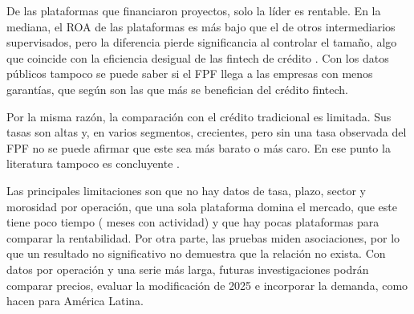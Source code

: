 De las plataformas que financiaron proyectos, solo la líder es rentable. En la mediana, el ROA de las plataformas es más bajo que el de otros intermediarios supervisados, pero la diferencia pierde significancia al controlar el tamaño, algo que coincide con la eficiencia desigual de las fintech de crédito \parencite{onorato2024,pampurini2024}. Con los datos públicos tampoco se puede saber si el FPF llega a las empresas con menos garantías, que según \textcite{hau2024} son las que más se benefician del crédito fintech.

Por la misma razón, la comparación con el crédito tradicional es limitada. Sus tasas son altas y, en varios segmentos, crecientes, pero sin una tasa observada del FPF no se puede afirmar que este sea más barato o más caro. En ese punto la literatura tampoco es concluyente \parencite{chu2024,fareed2025,vives2025}.

Las principales limitaciones son que no hay datos de tasa, plazo, sector y morosidad por operación, que una sola plataforma domina el mercado, que este tiene poco tiempo ( meses con actividad) y que hay pocas plataformas para comparar la rentabilidad. Por otra parte, las pruebas miden asociaciones, por lo que un resultado no significativo no demuestra que la relación no exista. Con datos por operación y una serie más larga, futuras investigaciones podrán comparar precios, evaluar la modificación de 2025 e incorporar la demanda, como hacen \textcite{alvarezfranco2026} para América Latina.
